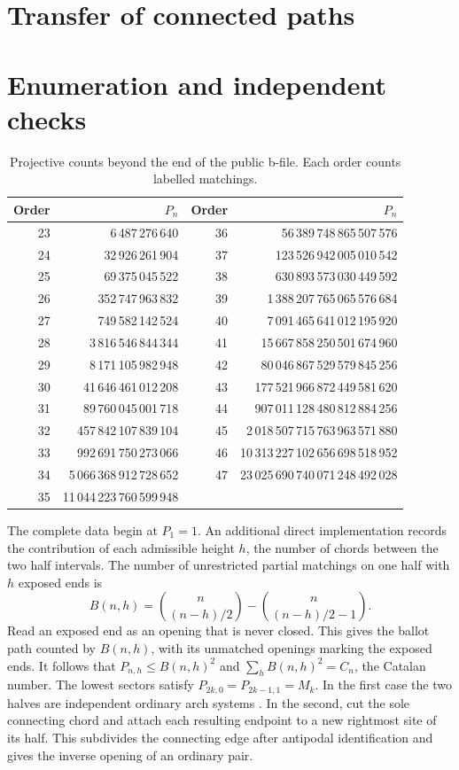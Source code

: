 \section{Transfer of connected paths}



\section{Enumeration and independent checks}
\begin{table}[htbp]\centering
\begin{tabular}{rr@{\hspace{2em}}rr}\toprule
Order&\(P_n\)&Order&\(P_n\)\\\midrule
23 & 6\,487\,276\,640 & 36 & 56\,389\,748\,865\,507\,576\\
24 & 32\,926\,261\,904 & 37 & 123\,526\,942\,005\,010\,542\\
25 & 69\,375\,045\,522 & 38 & 630\,893\,573\,030\,449\,592\\
26 & 352\,747\,963\,832 & 39 & 1\,388\,207\,765\,065\,576\,684\\
27 & 749\,582\,142\,524 & 40 & 7\,091\,465\,641\,012\,195\,920\\
28 & 3\,816\,546\,844\,344 & 41 & 15\,667\,858\,250\,501\,674\,960\\
29 & 8\,171\,105\,982\,948 & 42 & 80\,046\,867\,529\,579\,845\,256\\
30 & 41\,646\,461\,012\,208 & 43 & 177\,521\,966\,872\,449\,581\,620\\
31 & 89\,760\,045\,001\,718 & 44 & 907\,011\,128\,480\,812\,884\,256\\
32 & 457\,842\,107\,839\,104 & 45 & 2\,018\,507\,715\,763\,963\,571\,880\\
33 & 992\,691\,750\,273\,066 & 46 & 10\,313\,227\,102\,656\,698\,518\,952\\
34 & 5\,066\,368\,912\,728\,652 & 47 & 23\,025\,690\,740\,071\,248\,492\,028\\
35 & 11\,044\,223\,760\,599\,948 &  & \\
\bottomrule\end{tabular}
\caption{Projective counts beyond the end of the public b-file. Each order counts labelled matchings.}
\end{table}
The complete data begin at \(P_1=1\). An additional direct implementation records the contribution of each admissible height \(h\), the number of chords between the two half intervals. The number of unrestricted partial matchings on one half with \(h\) exposed ends is
\[
 B(n,h)=\binom n{(n-h)/2}-\binom n{(n-h)/2-1}.
\]
Read an exposed end as an opening that is never closed. This gives the ballot path counted by \(B(n,h)\), with its unmatched openings marking the exposed ends. It follows that \(P_{n,h}\le B(n,h)^2\) and \(\sum_h B(n,h)^2=C_n\), the Catalan number. The lowest sectors satisfy \(P_{2k,0}=P_{2k-1,1}=M_k\). In the first case the two halves are independent ordinary arch systems \cite[\S3.2]{lz}. In the second, cut the sole connecting chord and attach each resulting endpoint to a new rightmost site of its half. This subdivides the connecting edge after antipodal identification and gives the inverse opening of an ordinary pair.

